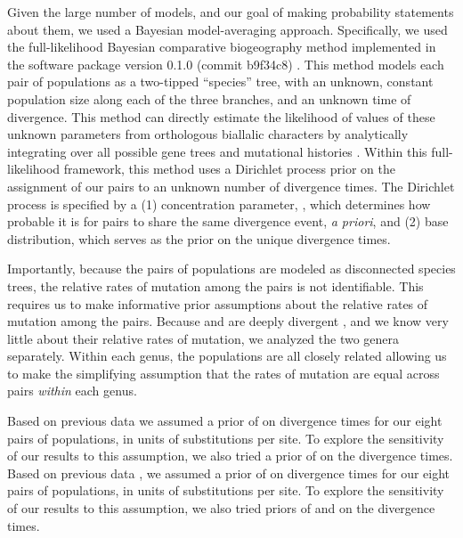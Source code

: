 Given the large number of models, and our goal of making probability statements
about them, we used a Bayesian model-averaging approach.
Specifically, we used the full-likelihood Bayesian comparative biogeography
method implemented in the software package \ecoevolity version 0.1.0 (commit
b9f34c8) \citep{Oaks2018ecoevolity}.
This method models each pair of populations as a two-tipped ``species'' tree,
with an unknown, constant population size along each of the three branches, and
an unknown time of divergence.
This method can directly estimate the likelihood of values of these unknown
parameters from orthologous biallalic characters by analytically integrating
over all possible gene trees and mutational histories \citep{Bryant2012,
    Oaks2018ecoevolity}.
Within this full-likelihood framework, this method uses a Dirichlet process
prior on the assignment of our pairs to an unknown number of divergence times.
The Dirichlet process is specified by a
(1) concentration parameter, \concentration, which determines how probable it
is for pairs to share the same divergence event, \emph{a priori}, and
(2) base distribution, which serves as the prior on the unique divergence
times.

Importantly, because the pairs of populations are modeled as disconnected
species trees, the relative rates of mutation among the pairs is not
identifiable.
This requires us to make informative prior assumptions about the relative rates
of mutation among the pairs.
Because  and  are deeply divergent
\citationNeeded, and we know very little about their relative rates of
mutation, we analyzed the two genera separately.
Within each genus, the populations are all closely related \citep{Welton2010,
    Welton2010zootaxa, Siler2010, Siler2012, Siler2014kikuchii} allowing us to
make the simplifying assumption that the rates of mutation are equal across
pairs \emph{within} each genus.

Based on previous data \citep{Welton2010, Welton2010zootaxa, Siler2010} we
assumed a prior of  on divergence times for our eight pairs
of  populations, in units of substitutions per site.
To explore the sensitivity of our results to this assumption, we also
tried a prior of  on the divergence times.
Based on previous data \citep{Siler2012, Siler2014kikuchii}, we assumed a prior
of  on divergence times for our eight pairs of 
populations, in units of substitutions per site.
To explore the sensitivity of our results to this assumption, we also tried
priors of  and  on the 
divergence times.

